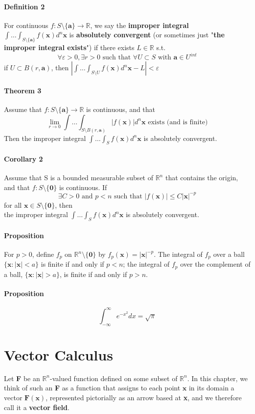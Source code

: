 \documentclass[11pt]{article}
\newcommand{\tb}[1]{\textbf{#1}}
\newcommand{\real}[0]{\mathbb{R}}
\newcommand{\vx}[0]{\tb{x}}
\newcommand{\vo}[0]{\tb{0}}
\newcommand{\va}[0]{\tb{a}}
\begin{document}
\paragraph{Definition 2} For continuous $f: S \setminus \{\tb{a}\} \rightarrow \real$, we say the \tb{improper integral} $\int \hdots \int_{S\setminus\{\va\}} f(\vx)d^n\vx$ is \tb{absolutely convergent} (or sometimes just "\tb{the improper integral exists}") if there exists $L \in \real$ s.t.
$$\forall \varepsilon >0, \exists r > 0 \mbox{ such that } \forall U \subset S \mbox{ with } \tb{a} \in U^{int}$$
if $ U \subset B(r, \tb{a})$, then $|\int \hdots \int_{S\setminus U} f(\vx) d^n\vx - L| < \varepsilon$

\paragraph{Theorem 3} Assume that $f: S\setminus\{\tb{a}\} \rightarrow \real$ is continuous, and that
$$\underset{r \rightarrow 0}{\lim} \int \hdots \int_{S\setminus B(r, \tb{a})} |f(\vx)|d^n\vx \mbox{ exists (and is finite)}$$
Then the improper integral $\int \hdots \int_{S}f(\vx)d^n\vx$ is absolutely convergent.
\paragraph{Corollary 2} Assume that S is a bounded measurable subset of $\real^n$ that contains the origin, and that $f: S \setminus \{\vo\}$ is continuous. If 
$$\exists C > 0 \mbox{ and } p < n \mbox{ such that } |f(\vx)|\leq C|\vx|^{-p}$$
for all $\vx \in S \setminus \{\vo\}$, then\\
the improper integral $\int \hdots \int_S f(\vx)d^n\vx$ is absolutely convergent.


\paragraph{Proposition} For $p > 0$, define $f_p$ on $\real^n \setminus \{\vo\}$ by $f_p(\vx) = |\vx|^{-p}$. The integral of $f_p$ over a ball $\{\vx:|\vx| < a\}$ is finite if and only if $p<n$; the integral of $f_p$ over the complement of a ball, $\{\vx:|\vx| > a\}$, is finite if and only if $p>n$.

\paragraph{Proposition} $$\int_{-\infty}^\infty e^{-x^2}dx = \sqrt{\pi}$$
\section{Vector Calculus}
Let \tb{F} be an $\real^n$-valued function defined on some subset of $\real^n$. In this chapter, we think of such an \tb{F} as a function that assigns to each point $\vx$ in its domain a vector $\tb{F}(\vx)$, represented pictorially as an arrow based at \vx, and we therefore call it a \tb{vector field}.
\end{document}
